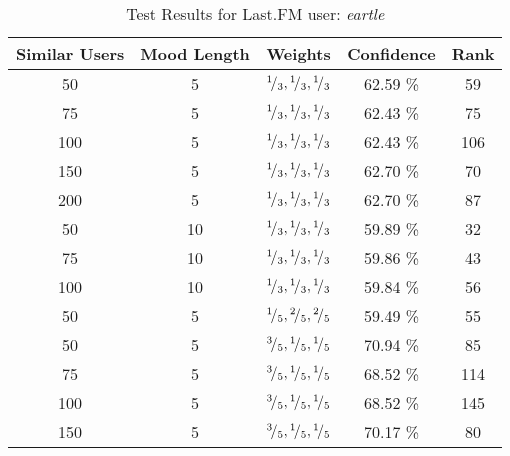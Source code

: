 \begin{table}[h!]
\centering
\begin{tabular}{ | c | c | c || c | c | }
\hline
Similar Users	& Mood Length	& Weights							&Confidence	&Rank\\
\hline \hline
50			& 5			& \({}^{1}\!/_{3}, {}^{1}\!/_{3}, {}^{1}\!/_{3}\)	&62.59 \%		&59\\
\hline
75			& 5			& \({}^{1}\!/_{3}, {}^{1}\!/_{3}, {}^{1}\!/_{3}\)	&62.43 \%		&75\\
\hline
100			& 5			& \({}^{1}\!/_{3}, {}^{1}\!/_{3}, {}^{1}\!/_{3}\)	&62.43 \%		&106\\
\hline
150			& 5			& \({}^{1}\!/_{3}, {}^{1}\!/_{3}, {}^{1}\!/_{3}\)	&62.70 \%		&70\\
\hline
200			& 5			& \({}^{1}\!/_{3}, {}^{1}\!/_{3}, {}^{1}\!/_{3}\)	&62.70 \%		&87\\
\hline
50			& 10			& \({}^{1}\!/_{3}, {}^{1}\!/_{3}, {}^{1}\!/_{3}\)	&59.89 \%		&32\\
\hline
75			& 10			& \({}^{1}\!/_{3}, {}^{1}\!/_{3}, {}^{1}\!/_{3}\)	&59.86 \%		&43\\
\hline
100			& 10			& \({}^{1}\!/_{3}, {}^{1}\!/_{3}, {}^{1}\!/_{3}\)	&59.84 \%		&56\\
\hline
50			& 5			& \({}^{1}\!/_{5}, {}^{2}\!/_{5}, {}^{2}\!/_{5}\)	&59.49 \%		&55\\
\hline
50			& 5			& \({}^{3}\!/_{5}, {}^{1}\!/_{5}, {}^{1}\!/_{5}\)	&70.94 \%		&85\\
\hline
75			& 5			& \({}^{3}\!/_{5}, {}^{1}\!/_{5}, {}^{1}\!/_{5}\)	&68.52 \%		&114\\
\hline
100			& 5			& \({}^{3}\!/_{5}, {}^{1}\!/_{5}, {}^{1}\!/_{5}\)	&68.52 \%		&145\\
\hline
150			& 5			& \({}^{3}\!/_{5}, {}^{1}\!/_{5}, {}^{1}\!/_{5}\)	&70.17 \%		&80\\
\hline
\end{tabular}
\caption{Test Results for Last.FM user: \emph{eartle}}
\label{table:test_results_eartle}
\end{table}

